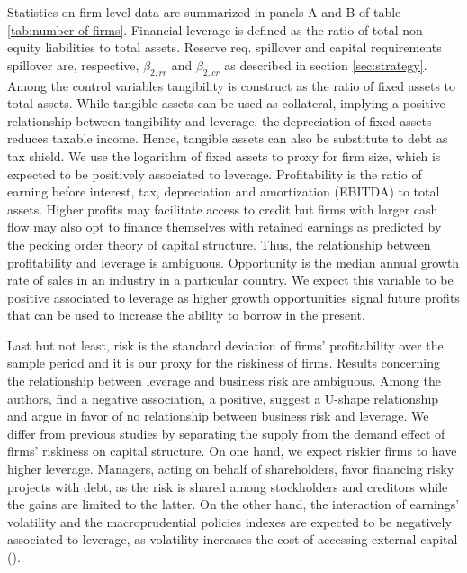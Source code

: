 \documentclass[12pt]{article}
\begin{document}
	Statistics on firm level data are summarized in panels A and B of table \ref{tab:number of firms}. Financial leverage is defined as the ratio of total non-equity liabilities to total assets. Reserve req. spillover and capital requirements spillover are, respective, $\beta_{2,rr}$ and $\beta_{2,cr}$ as described in section \ref{sec:strategy}. Among the control variables tangibility is construct as the ratio of fixed assets to total assets. While tangible assets can be used as collateral, implying a positive relationship between tangibility and leverage, the depreciation of fixed assets reduces taxable income. Hence, tangible assets can also be substitute to debt as tax shield. We use the logarithm of fixed assets to proxy for firm size, which is expected to be positively associated to leverage. Profitability is the ratio of earning before interest, tax, depreciation and amortization (EBITDA) to total assets. Higher profits may facilitate access to credit but firms with larger cash flow may also opt to finance themselves with retained earnings as predicted by the pecking order theory of capital structure. Thus, the relationship between profitability and leverage is ambiguous. Opportunity is the median annual growth rate of sales in an industry in a particular country. We expect this variable to be positive associated to leverage as higher growth opportunities signal future profits that can be used to increase the ability to borrow in the present. 
	   
		\begin{small}
		{
			
		}
	\end{small}

Last but not least, risk is the standard deviation of firms' profitability over the sample period and it is our proxy for the riskiness of firms. Results concerning the relationship between leverage and business risk are ambiguous. Among the authors, \cite*{bradley1984existence} find a negative association, \cite*{bennett1993determinants} a positive, \cite*{kale1991effect} suggest a U-shape relationship and \cite{titman1988determinants} argue in favor of no relationship between business risk and leverage. We differ from previous studies by separating the supply from the demand effect of firms' riskiness on capital structure. On one hand, we expect riskier firms to have higher leverage.  Managers, acting on behalf of shareholders, favor financing risky projects with debt, as the risk is shared among stockholders and creditors while the gains are limited to the latter. On the other hand, the interaction of earnings' volatility and the macroprudential policies indexes are expected to be negatively associated to leverage, as volatility increases the cost of accessing external capital (\cite{minton1999impact}).
\end{document}
